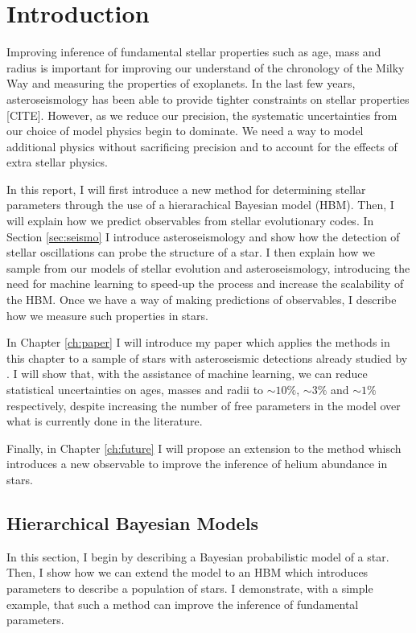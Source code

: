 \chapter{Introduction}

Improving inference of fundamental stellar properties such as age, mass and radius is important for improving our understand of the chronology of the Milky Way and measuring the properties of exoplanets. In the last few years, asteroseismology has been able to provide tighter constraints on stellar properties [CITE]. However, as we reduce our precision, the systematic uncertainties from our choice of model physics begin to dominate. We need a way to model additional physics without sacrificing precision and to account for the effects of extra stellar physics.

In this report, I will first introduce a new method for determining stellar parameters through the use of a hierarachical Bayesian model (HBM). Then, I will explain how we predict observables from stellar evolutionary codes. In Section \ref{sec:seismo} I introduce asteroseismology and show how the detection of stellar oscillations can probe the structure of a star. I then explain how we sample from our models of stellar evolution and asteroseismology, introducing the need for machine learning to speed-up the process and increase the scalability of the HBM. Once we have a way of making predictions of observables, I describe how we measure such properties in stars.

In Chapter \ref{ch:paper} I will introduce my paper which applies the methods in this chapter to a sample of stars with asteroseismic detections already studied by \citet{Serenelli.Johnson.ea2017}. I will show that, with the assistance of machine learning, we can reduce statistical uncertainties on ages, masses and radii to $\sim 10\%$, $\sim 3\%$ and $\sim 1\%$ respectively, despite increasing the number of free parameters in the model over what is currently done in the literature.

Finally, in Chapter \ref{ch:future} I will propose an extension to the method whisch introduces a new observable to improve the inference of helium abundance in stars.

\section{Hierarchical Bayesian Models}\label{sec:hbm}

In this section, I begin by describing a Bayesian probabilistic model of a star. Then, I show how we can extend the model to an HBM which introduces parameters to describe a population of stars. I demonstrate, with a simple example, that such a method can improve the inference of fundamental parameters.

